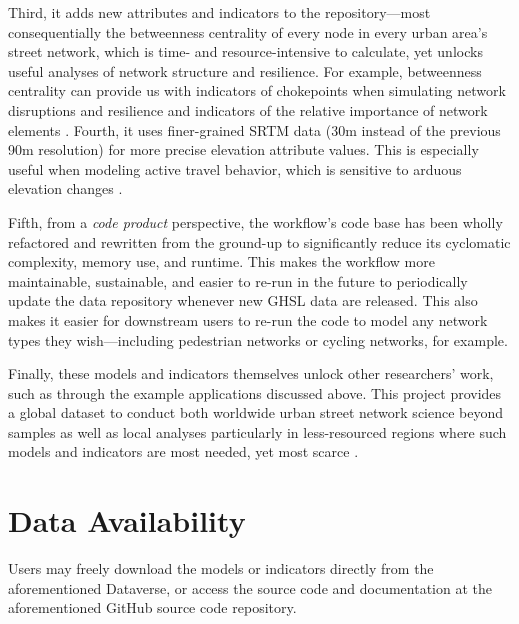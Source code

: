 \documentclass[12pt,letterpaper]{article} %
\begin{document}
Third, it adds new attributes and indicators to the repository---most consequentially the betweenness centrality of every node in every urban area's street network, which is time- and resource-intensive to calculate, yet unlocks useful analyses of network structure and resilience. For example, betweenness centrality can provide us with indicators of chokepoints when simulating network disruptions and resilience \citep{boeing_resilient_2024} and indicators of the relative importance of network elements \citep{barthelemy_universal_2025}. Fourth, it uses finer-grained SRTM data (30m instead of the previous 90m resolution) for more precise elevation attribute values. This is especially useful when modeling active travel behavior, which is sensitive to arduous elevation changes \citep{barthelemy_surfacic_2024}.

Fifth, from a \textit{code product} perspective, the workflow's code base has been wholly refactored and rewritten from the ground-up to significantly reduce its cyclomatic complexity, memory use, and runtime. This makes the workflow more maintainable, sustainable, and easier to re-run in the future to periodically update the data repository whenever new GHSL data are released. This also makes it easier for downstream users to re-run the code to model any network types they wish---including pedestrian networks or cycling networks, for example.

Finally, these models and indicators themselves unlock other researchers' work, such as through the example applications discussed above. This project provides a global dataset to conduct both worldwide urban street network science beyond samples as well as local analyses particularly in less-resourced regions where such models and indicators are most needed, yet most scarce \citep{giles-corti_creating_2022}.

\section{Data Availability}

Users may freely download the models or indicators directly from the aforementioned Dataverse, or access the source code and documentation at the aforementioned GitHub source code repository.


\setlength{\bibsep}{0.00cm plus 0.05cm} %


\end{document}
